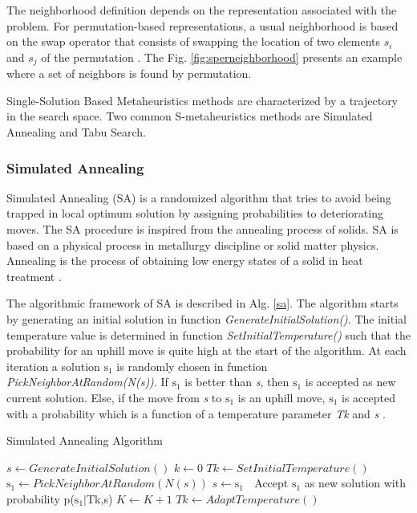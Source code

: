 \documentclass{bmcart}
\begin{document}
The neighborhood definition depends on the representation associated with the problem. For permutation-based representations, a usual neighborhood is based on the swap operator that consists of swapping the location of two elements $s_i$ and $s_j$ of the permutation \citep{Talbi2013}. The Fig. \ref{fig:sperneighborhood} presents an example where a set of neighbors is found by permutation. 





Single-Solution Based Metaheuristics methods are characterized by a trajectory in the search space. Two common S-metaheuristics methods are Simulated Annealing and Tabu Search.


\subsubsection{Simulated Annealing}

Simulated Annealing (SA) is a randomized algorithm that tries to avoid being trapped in local optimum solution by assigning probabilities to deteriorating moves. The SA procedure is inspired from the annealing process of solids. SA is based on a physical
process in metallurgy discipline or solid matter physics. Annealing is the process of obtaining low energy states of a solid in heat treatment \citep{Jaziri2008}. 

The algorithmic framework of SA is described in Alg. \ref{sa}.  The algorithm starts by generating an initial solution in function \textit{GenerateInitialSolution()}. The initial temperature value is determined in function \textit{SetInitialTemperature()} such that the probability for an uphill move is quite high at the start of the algorithm. At each iteration a solution $\mbox{s}_1$ is randomly chosen in function \textit{PickNeighborAtRandom(N(s))}. If \textit{$\mbox{s}_1$} is better than \textit{s}, then \textit{$\mbox{s}_1$} is accepted as new current solution. Else, if the move from \textit{s} to \textit{$\mbox{s}_1$} is an uphill move, \textit{$\mbox{s}_1$}  is accepted with a probability which is a function of a temperature parameter \textit{Tk} and \textit{s} \citep{raidl2010metaheuristic}. 

\begin{algorithm}[h]
  \caption{Simulated Annealing Algorithm}\label{sa}
  \begin{algorithmic}[1]
    
    \State $s\gets GenerateInitialSolution()$
    \State $k\gets 0 $
    \State $Tk\gets SetInitialTemperature()$
    \State $\mbox{s}_1\gets PickNeighborAtRandom(N (s))$
    \State $s\gets\mbox{s}_1$
    \Else $\;$ Accept $\mbox{s}_1$ as new solution with probability p($\mbox{s}_1|$Tk,s) 
    \EndIf
    \State $K\gets K+1$
    \State $Tk\gets AdaptTemperature()$
    \EndWhile
      
  \end{algorithmic}
\end{algorithm}
\end{document}

